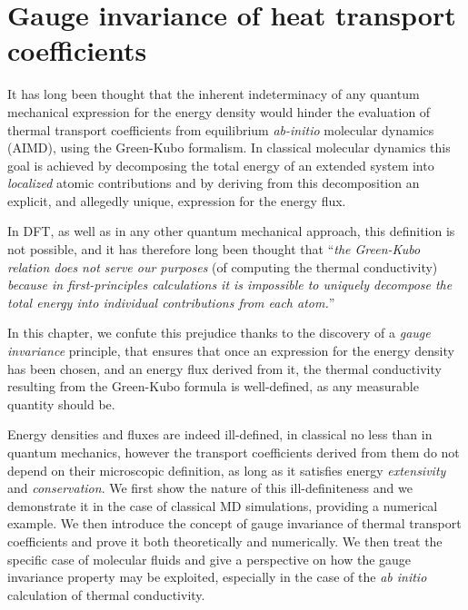 \chapter{Gauge invariance of heat transport coefficients} \label{ch:gauge-invariance}

\begin{LEtext}
It has long been thought that the inherent indeterminacy of any quantum mechanical expression for the energy density would hinder the evaluation of thermal transport coefficients from equilibrium \emph{ab-initio} molecular dynamics (AIMD), using the Green-Kubo formalism.  
In classical molecular dynamics this goal is achieved by decomposing the total energy of an extended system into \emph{localized} atomic contributions and by deriving from this decomposition an explicit, and allegedly unique, expression for the energy flux. \cite{Irving1950}

In DFT, as well as in any other quantum mechanical approach, this definition is not possible, and it has therefore long been thought that ``\emph{the Green-Kubo relation does not serve our purposes} (of computing the thermal conductivity) \emph{because in first-principles calculations it is impossible to uniquely decompose the total energy into individual contributions from each atom.}'' \cite{Stackhouse2010b}

In this chapter, we confute this prejudice thanks to the discovery of a \emph{gauge invariance} principle, that ensures that once an expression for the energy density has been chosen, and an energy flux derived from it, the thermal conductivity resulting from the Green-Kubo formula is well-defined, as any measurable quantity should be. 

Energy densities and fluxes are indeed ill-defined, in classical no less than in quantum mechanics, however the transport coefficients derived from them do not depend on their microscopic definition, as long as it satisfies energy \emph{extensivity} and \emph{conservation}. 
We first show the nature of this ill-definiteness and we demonstrate it in the case of classical MD simulations, providing a numerical example. We then introduce the concept of gauge invariance of thermal transport coefficients and prove it both theoretically and numerically.
We then treat the specific case of molecular fluids and give a perspective on how the gauge invariance property may be exploited, especially in the case of the \emph{ab initio} calculation of thermal conductivity.
\end{LEtext}


